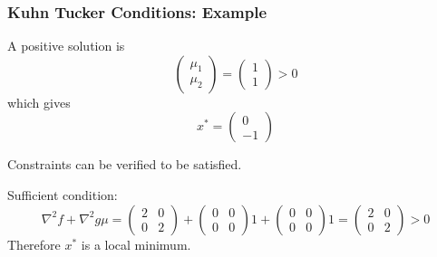 \documentclass{beamer}
\begin{document}
\begin{frame}\frametitle{Kuhn Tucker Conditions: Example }
	A positive solution is
	\[ 
		\begin{pmatrix}
	    	\mu_1\\
	    	\mu_2
	  	\end{pmatrix} = 
	  	\begin{pmatrix}
	    	1\\1
	  	\end{pmatrix} > 0 
	\]
	which gives
	\[
		x^{\ast} = 
			\begin{pmatrix}
	      		0 \\ -1
	    	\end{pmatrix}
	\]
	
	\vfill
	
	Constraints can be verified to be satisfied.
	
	\vfill
	
	
	Sufficient condition:
	\[ 
		\nabla^2 f + \nabla^2 g \mu = 
			\begin{pmatrix}
	    		2 & 0\\
	    		0 & 2
	  		\end{pmatrix} + 
	  		\begin{pmatrix}
	    		0 & 0\\
	    		0 & 0
	  		\end{pmatrix}1 + 
	  		\begin{pmatrix}
	    		0 & 0\\
	    		0 & 0
	  		\end{pmatrix}1 = 
	  		\begin{pmatrix}
	    		2 & 0\\
	    		0 & 2
	  		\end{pmatrix} > 0
	\]
	Therefore $x^{\ast}$ is a local minimum.	
\end{frame}
\end{document}
